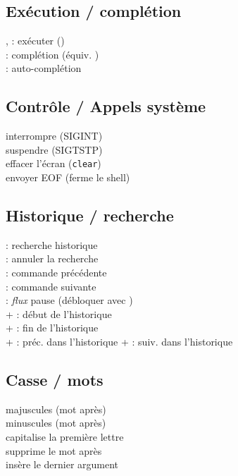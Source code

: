 \documentclass[10pt]{article}
\begin{document}
\begin{multicols}{4}
\subsection*{Exécution / complétion}

,  : exécuter (\keys{\return}) \\
 : complétion (équiv. \keys{\tab}) \\
\keys{\tab}{} : auto-complétion \\

\subsection*{Contrôle / Appels système}

 \quad interrompre (SIGINT) \\
 \quad suspendre (SIGTSTP) \\
 \quad effacer l'écran (\lstinline|clear|) \\
 \quad envoyer EOF (ferme le shell) \\

\subsection*{Historique / recherche}

 : recherche historique \\
 : annuler la recherche \\
 : commande précédente \\
 : commande suivante \\
 : \emph{flux} pause (débloquer avec ) \\
\keys{\Alt}+\keys{<} : début de l'historique \\
\keys{\Alt}+\keys{>} : fin de l'historique \\
\keys{\Alt}+ : préc. dans l'historique \quad
\keys{\Alt}+ : suiv. dans l'historique \\[2pt]

\subsection*{Casse / mots}

 \quad majuscules (mot après) \\
 \quad minuscules (mot après) \\
 \quad capitalise la première lettre \\
 \quad supprime le mot après \\
 \quad insère le dernier argument \\


\end{multicols}
\end{document}
